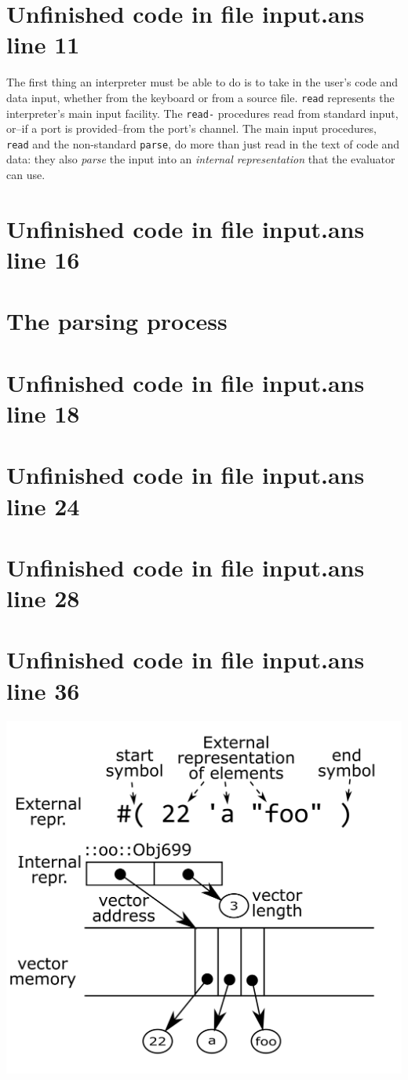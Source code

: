 \documentclass[twoside,9pt]{report}
\begin{document}
\section{Unfinished code in file input.ans line 11}

The first thing an interpreter must be able to do is to take in the user's code and data input, whether from the keyboard or from a source file. \texttt{read} represents the interpreter's main input facility. The \texttt{read-} procedures read from standard input, or--if a port is provided--from the port's channel. The main input procedures, \texttt{read} and the non-standard \texttt{parse}, do more than just read in the text of code and data: they also \emph{parse} the input into an \emph{internal representation} that the evaluator can use.

\section{Unfinished code in file input.ans line 16}
\section{The parsing process}
\label{the-parsing-process}
\section{Unfinished code in file input.ans line 18}

\section{Unfinished code in file input.ans line 24}
\section{Unfinished code in file input.ans line 28}
\section{Unfinished code in file input.ans line 36}
\includegraphics{images/vector-representation.png}
\end{document}
